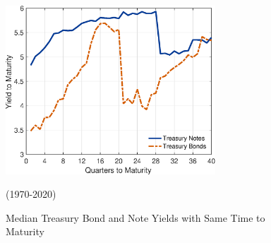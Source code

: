\documentclass[11pt,a4paper,margin=1.5in]{article}
\begin{document}
\begin{figure}[h]
\centering
\includegraphics[width=0.7\textwidth]{../Figures/BondNote_Spread.eps}
\caption{Median Treasury Bond and Note Yields with Same Time to Maturity}{(1970-2020)}
\label{fig:YTM_Spread}
\end{figure}
\end{document}

